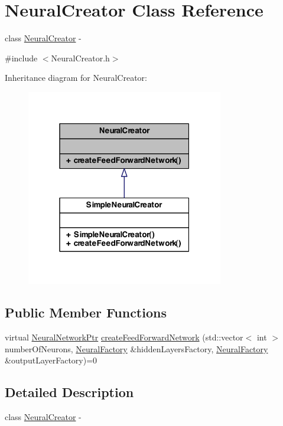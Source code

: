 \hypertarget{class_neural_creator}{
\section{NeuralCreator Class Reference}
\label{class_neural_creator}
}


class \hyperlink{class_neural_creator}{NeuralCreator} -\/  




{\ttfamily \#include $<$NeuralCreator.h$>$}



Inheritance diagram for NeuralCreator:\nopagebreak
\begin{figure}[H]
\begin{center}
\leavevmode
\includegraphics[width=244pt]{class_neural_creator__inherit__graph}
\end{center}
\end{figure}
\subsection*{Public Member Functions}
\begin{DoxyCompactItemize}
\item 
virtual \hyperlink{_a_m_o_r_e_8h_a7adadf1c313313507b00cd1193db29a1}{NeuralNetworkPtr} \hyperlink{class_neural_creator_a611ada630d83418fbd4ade790a1e655e}{createFeedForwardNetwork} (std::vector$<$ int $>$ numberOfNeurons, \hyperlink{class_neural_factory}{NeuralFactory} \&hiddenLayersFactory, \hyperlink{class_neural_factory}{NeuralFactory} \&outputLayerFactory)=0
\end{DoxyCompactItemize}


\subsection{Detailed Description}
class \hyperlink{class_neural_creator}{NeuralCreator} -\/ 

